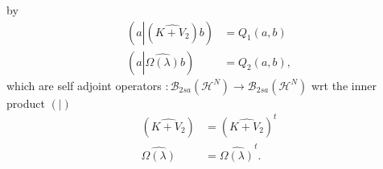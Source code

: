 \documentclass[aps,preprint]{revtex4}%
\begin{document}
by
\begin{align}
\left(  a\left\vert \left(  \widehat{K+V_{2}}\right)  \right.  b\right)   &
=Q_{1}\left(  a,b\right) \nonumber\\
\left(  a\left\vert \widehat{\Omega\left(  \lambda\right)  }\right.  b\right)
&  =Q_{2}\left(  a,b\right)  ,
\end{align}
which are self adjoint operators $:\mathcal{B}_{2sa}\left(  \mathcal{H}%
^{N}\right)  \rightarrow\mathcal{B}_{2sa}\left(  \mathcal{H}^{N}\right)  $ wrt
the inner product $\left(  |\right)  $
\begin{align}
\left(  \widehat{K+V_{2}}\right)   &  =\left(  \widehat{K+V_{2}}\right)
^{t}\\
\widehat{\Omega\left(  \lambda\right)  }  &  =\widehat{\Omega\left(
\lambda\right)  }^{t}.
\end{align}
\end{document}
